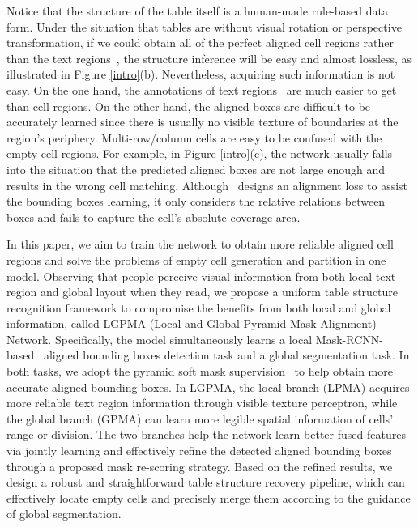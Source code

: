 \documentclass[runningheads]{llncs}
\begin{document}
Notice that the structure of the table itself is a human-made rule-based data form. Under the situation that tables are without visual rotation or perspective transformation, if we could obtain all of the perfect aligned cell regions rather than the text regions~\cite{raja2020table}, the structure inference will be easy and almost lossless, as illustrated in Figure \ref{intro}(b). Nevertheless, acquiring such information is not easy. On the one hand, the annotations of text regions~\cite{gobel2013icdar,chi2019complicated,zhong2019image} are much easier to get than cell regions. On the other hand, the aligned boxes are difficult to be accurately learned since there is usually no visible texture of boundaries at the region's periphery.  Multi-row/column cells are easy to be confused with the empty cell regions. For example, in Figure \ref{intro}(c), the network usually falls into the situation that the predicted aligned boxes are not large enough and results in the wrong cell matching. Although~\cite{raja2020table} designs an alignment loss to assist the bounding boxes learning, it only considers the relative relations between boxes and fails to capture the cell's absolute coverage area.

In this paper, we aim to train the network to obtain more reliable aligned cell regions and solve the problems of empty cell generation and partition in one model.
Observing that people perceive visual information from both local text region and global layout when they read, we propose a uniform table structure recognition framework to compromise the benefits from both local and global information, called LGPMA (Local and Global Pyramid Mask Alignment) Network. Specifically, the model simultaneously learns a local Mask-RCNN-based~\cite{he2017mask} aligned bounding boxes detection task and a global segmentation task. In both tasks, we adopt the pyramid soft mask supervision~\cite{liu2019pyramid} to help obtain more accurate aligned bounding boxes. In LGPMA, the local branch (LPMA) acquires more reliable text region information through visible texture perceptron, while the global branch (GPMA) can learn more legible spatial information of cells' range or division.
The two branches help the network learn better-fused features via jointly learning and effectively refine the detected aligned bounding boxes through a proposed mask re-scoring strategy. Based on the refined results, we design a robust and straightforward table structure recovery pipeline, which can effectively locate empty cells and precisely merge them according to the guidance of global segmentation.
\end{document}
